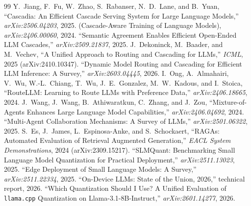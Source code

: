 \documentclass[11pt]{article}
\begin{document}
\begin{thebibliography}{99}
\small
{} Y.~Jiang, F.~Fu, W.~Zhao, S.~Rabanser, N.~D.~Lane, and B.~Yuan,
``Cascadia: An Efficient Cascade Serving System for Large Language Models,''
\emph{arXiv:2506.04203}, 2025.
 (Cascade-Aware Training of Language Models),
\emph{arXiv:2406.00060}, 2024.
 ``Semantic Agreement Enables Efficient Open-Ended LLM
Cascades,'' \emph{arXiv:2509.21837}, 2025.
 J.~Dekoninck, M.~Baader, and M.~Vechev, ``A Unified
Approach to Routing and Cascading for LLMs,'' \emph{ICML}, 2025 (arXiv:2410.10347).
 ``Dynamic Model Routing and Cascading for Efficient LLM
Inference: A Survey,'' \emph{arXiv:2603.04445}, 2026.
 I.~Ong, A.~Almahairi, V.~Wu, W.-L.~Chiang, T.~Wu,
J.~E.~Gonzalez, M.~W.~Kadous, and I.~Stoica, ``RouteLLM: Learning to Route LLMs with
Preference Data,'' \emph{arXiv:2406.18665}, 2024.
 J.~Wang, J.~Wang, B.~Athiwaratkun, C.~Zhang, and J.~Zou,
``Mixture-of-Agents Enhances Large Language Model Capabilities,''
\emph{arXiv:2406.04692}, 2024.
 ``Multi-Agent Collaboration Mechanisms: A Survey of LLMs,''
\emph{arXiv:2501.06322}, 2025.
 S.~Es, J.~James, L.~Espinosa-Anke, and S.~Schockaert, ``RAGAs:
Automated Evaluation of Retrieval Augmented Generation,'' \emph{EACL System
Demonstrations}, 2024 (arXiv:2309.15217).
 ``SLMQuant: Benchmarking Small Language Model Quantization for
Practical Deployment,'' \emph{arXiv:2511.13023}, 2025.
 ``Edge Deployment of Small Language Models: A Survey,''
\emph{arXiv:2511.22334}, 2025.
 ``On-Device LLMs: State of the Union, 2026,'' technical
report, 2026.
 ``Which Quantization Should I Use? A Unified Evaluation of
\texttt{llama.cpp} Quantization on Llama-3.1-8B-Instruct,'' \emph{arXiv:2601.14277},
2026.
\end{thebibliography}
\end{document}
